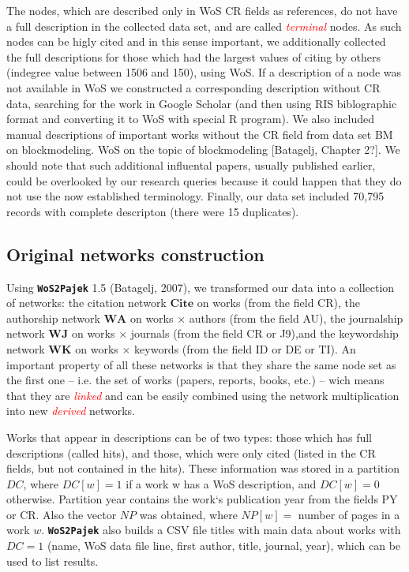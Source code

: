 \documentclass[11pt]{article} %
\newcommand{\WoSPajek}{\texttt{\textbf{WoS2Pajek}}\xspace}
\newcommand{\keyw}[1]{\textcolor{red}{\emph{#1}}}
\newcommand{\WA}{\mathbf{W\!\!A}}
\newcommand{\WK}{\mathbf{W\!K}}
\newcommand{\WJ}{\mathbf{W\!J}}
\newcommand{\Ci}{\mathbf{Cite}}
\newcommand{\NP}{N\!P}
\begin{document}
The nodes, which are described only in WoS CR fields as references, do not have a full description in the collected data set, and are called \keyw{terminal} nodes. As such nodes can be higly cited and in this sense important, we additionally collected the full descriptions for those which had the  largest values of citing by others (indegree value between 1506 and 150), using WoS. If a description of a node was not available in WoS we constructed a corresponding description without CR data, searching for the work in Google Scholar (and then using RIS biblographic format and converting it to WoS with special R program). We also included manual descriptions of important works without the CR field from data set BM on blockmodeling. WoS on the topic of blockmodeling [Batagelj, Chapter 2?]. We should note that such additional influental papers, usually published earlier, could be overlooked by our research queries because it could happen that they do not use the now established terminology. Finally, our data set included 70,795 records with complete descripton (there were 15 duplicates).  \medskip

\subsection{Original networks construction}

Using \WoSPajek 1.5  (Batagelj, 2007), we transformed our data into a collection of networks: the citation network $\Ci$ on works (from the field CR), the authorship network $\WA$ on works $\times$ authors  (from the field AU),  the journalship network $\WJ$ on  works $\times$ journals  (from the field CR or J9),and the keywordship network $\WK$ on works  $\times$ keywords (from the field ID or DE or TI). An important property of all these networks is that they share the same node set as the first one -- i.e. the set of works (papers, reports, books, etc.) -- wich means that they are \keyw{linked} and can be easily combined using the network multiplication into new \keyw{derived}  networks. \medskip

Works that appear in descriptions can be of two types: those which has full descriptions (called hits), and those, which were only cited (listed in the CR fields, but not contained in the hits). These information was stored in a partition $DC$, where $DC[w] = 1$ if a work w has a WoS description, and $DC[w] = 0$ otherwise. Partition year contains the work`s publication year from the fields PY or CR. Also the vector $\NP$ was obtained, where $\NP[w] =$ number of pages in a work $w$. \WoSPajek also builds a CSV file titles with main data about works with $DC = 1$ (name, WoS data file line, first author, title, journal, year), which can be used to list results. \medskip 
\end{document}
